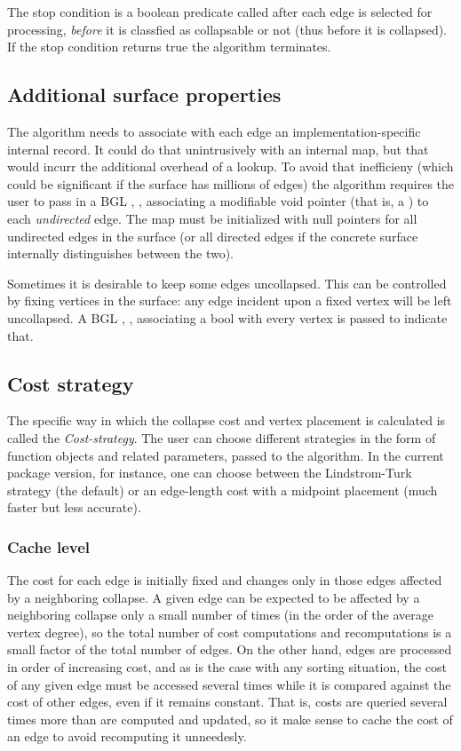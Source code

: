 The stop condition is a boolean predicate called after each edge is selected for processing, {\em before} it is classfied as collapsable or not (thus before it is collapsed). If the stop condition returns true the algorithm terminates.

\subsection{Additional surface properties}

The algorithm needs to associate with each edge an implementation-specific internal record. It could do that unintrusively with an internal map, but that would incurr the additional overhead of a lookup. To avoid that inefficieny (which could be significant if the surface has millions of edges) the algorithm requires the user to pass in a BGL , , associating a modifiable void pointer (that is, a ) to each {\em undirected} edge. The map must be initialized with null pointers for all undirected edges in the surface (or all directed edges if the concrete surface internally distinguishes between the two). 

Sometimes it is desirable to keep some edges uncollapsed. This can be controlled by fixing vertices in the surface: any edge incident upon a fixed vertex will be left uncollapsed. A BGL , , associating a bool with every vertex is passed to indicate that.

\subsection{Cost strategy}

The specific way in which the collapse cost and vertex placement is calculated is called the {\em Cost-strategy}.
The user can choose different strategies in the form of function objects and related parameters, passed to the algorithm.
In the current package version, for instance, one can choose between the Lindstrom-Turk strategy (the default) or an edge-length cost with a midpoint placement (much faster but less accurate).

\subsubsection{Cache level}

The cost for each edge is initially fixed and changes only in those edges affected by a neighboring collapse. A given edge can be expected to be affected by a neighboring collapse only a small number of times (in the order of the average vertex degree), so the total number of cost computations and recomputations is a small factor of the total number of edges. On the other hand, edges are processed in order of increasing cost, and as is the case with any sorting situation, the cost of any given edge must be accessed several times while it is compared against the cost of other edges, even if it remains constant. That is, costs are queried several times more than are computed and updated, so it make sense to cache the cost of an edge to avoid recomputing it unneedesly.

